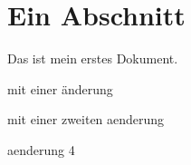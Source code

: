 \documentclass{scrartcl}
\begin{document}
\section{Ein Abschnitt}
Das ist mein erstes Dokument.

mit einer änderung

mit einer zweiten aenderung

aenderung 4
\end{document}
